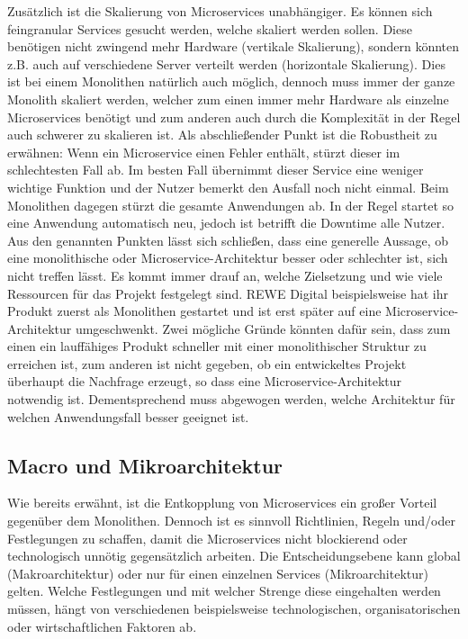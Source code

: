 Zusätzlich ist die Skalierung von Microservices unabhängiger. Es können sich feingranular Services gesucht werden, welche skaliert werden sollen. Diese benötigen nicht zwingend mehr Hardware (vertikale Skalierung), sondern könnten z.B. auch auf verschiedene Server verteilt werden (horizontale Skalierung). Dies ist bei einem Monolithen natürlich auch möglich, dennoch muss immer der ganze Monolith skaliert werden, welcher zum einen immer mehr Hardware als einzelne Microservices benötigt und zum anderen auch durch die Komplexität in der Regel auch schwerer zu skalieren ist.\cite{wolff2018mic_praxis}   
Als abschließender Punkt ist die Robustheit zu erwähnen: Wenn ein Microservice einen Fehler enthält, stürzt dieser im schlechtesten Fall ab. Im besten Fall übernimmt dieser Service eine weniger wichtige Funktion und der Nutzer bemerkt den Ausfall noch nicht einmal. Beim Monolithen dagegen stürzt die gesamte Anwendungen ab. In der Regel startet so eine Anwendung automatisch neu, jedoch ist betrifft die Downtime alle Nutzer. \\

Aus den genannten Punkten lässt sich schließen, dass eine generelle Aussage, ob eine monolithische oder Microservice-Architektur besser oder schlechter ist, sich nicht treffen lässt. Es kommt immer drauf an, welche Zielsetzung und wie viele Ressourcen für das Projekt festgelegt sind. REWE Digital beispielsweise hat ihr Produkt zuerst als Monolithen gestartet und ist erst später auf eine Microservice-Architektur umgeschwenkt.\cite{rewe2019mic_ppp} Zwei mögliche Gründe könnten dafür sein, dass zum einen ein lauffähiges Produkt schneller mit einer monolithischer Struktur zu erreichen ist, zum anderen ist nicht gegeben, ob ein entwickeltes Projekt überhaupt die Nachfrage erzeugt, so dass eine Microservice-Architektur notwendig ist. Dementsprechend muss abgewogen werden, welche Architektur für welchen Anwendungsfall besser geeignet ist.\cite{wolff2018mic_praxis} 

\subsection{Macro und Mikroarchitektur}

Wie bereits erwähnt, ist die Entkopplung von Microservices ein großer Vorteil gegenüber dem Monolithen. Dennoch ist es sinnvoll Richtlinien, Regeln und/oder Festlegungen zu schaffen, damit die Microservices nicht blockierend oder technologisch unnötig gegensätzlich arbeiten. Die Entscheidungsebene kann global (Makroarchitektur) oder nur für einen einzelnen Services (Mikroarchitektur) gelten.\cite{wolff2016mic_architectures} Welche Festlegungen und mit welcher Strenge diese eingehalten werden müssen, hängt von verschiedenen beispielsweise technologischen, organisatorischen oder wirtschaftlichen Faktoren ab.\\ 

